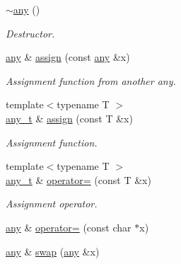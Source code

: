 \begin{DoxyCompactItemize}
\mbox{\label{classtrees_1_1any_a868cb1536d483870e821cfb0951081ba}} 
\hyperlink{classtrees_1_1any_a868cb1536d483870e821cfb0951081ba}{$\sim$any} ()
\begin{DoxyCompactList}\small\item\em Destructor. \end{DoxyCompactList}\item 
\mbox{\label{classtrees_1_1any_aedacba6142179a40790c48f28bea1539}} 
\hyperlink{classtrees_1_1any}{any} \& \hyperlink{classtrees_1_1any_aedacba6142179a40790c48f28bea1539}{assign} (const \hyperlink{classtrees_1_1any}{any} \&x)
\begin{DoxyCompactList}\small\item\em Assignment function from another any. \end{DoxyCompactList}\item 
\mbox{\label{classtrees_1_1any_ae65f68720864c002b9af9af9516da06d}} 
{\footnotesize template$<$typename T $>$ }\\\hyperlink{classtrees_1_1any}{any\+\_\+t} \& \hyperlink{classtrees_1_1any_ae65f68720864c002b9af9af9516da06d}{assign} (const T \&x)
\begin{DoxyCompactList}\small\item\em Assignment function. \end{DoxyCompactList}\item 
\mbox{\label{classtrees_1_1any_ae53018cf3889a1431de544682a0250f0}} 
{\footnotesize template$<$typename T $>$ }\\\hyperlink{classtrees_1_1any}{any\+\_\+t} \& \hyperlink{classtrees_1_1any_ae53018cf3889a1431de544682a0250f0}{operator=} (const T \&x)
\begin{DoxyCompactList}\small\item\em Assignment operator. \end{DoxyCompactList}\item 
\hyperlink{classtrees_1_1any}{any} \& \hyperlink{classtrees_1_1any_a0368d90cf359207445c6cec185933ea1}{operator=} (const char $\ast$x)
\item 
\mbox{\label{classtrees_1_1any_a869d8a1beb67e4d0abfa4fdf110b4e63}} 
\hyperlink{classtrees_1_1any}{any} \& \hyperlink{classtrees_1_1any_a869d8a1beb67e4d0abfa4fdf110b4e63}{swap} (\hyperlink{classtrees_1_1any}{any} \&x)

\end{DoxyCompactItemize}
